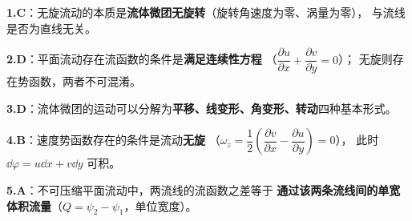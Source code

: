 \begin{tishi}
\begin{xiaowen}
\item \textbf{1.C}：无旋流动的本质是\textbf{流体微团无旋转}（旋转角速度为零、涡量为零），
与流线是否为直线无关。
\item \textbf{2.D}：平面流动存在流函数的条件是\textbf{满足连续性方程}
（$\dfrac{\partial u}{\partial x}+\dfrac{\partial v}{\partial y}=0$）；
无旋则存在势函数，两者不可混淆。
\item \textbf{3.D}：流体微团的运动可以分解为\textbf{平移、线变形、角变形、转动}四种基本形式。
\item \textbf{4.B}：速度势函数存在的条件是流动\textbf{无旋}
（$\omega_z=\dfrac{1}{2}\left(\dfrac{\partial v}{\partial x}-\dfrac{\partial u}{\partial y}\right)=0$），
此时 $\dd\varphi=u\dd x+v\dd y$ 可积。
\item \textbf{5.A}：不可压缩平面流动中，两流线的流函数之差等于
\textbf{通过该两条流线间的单宽体积流量}（$Q=\psi_2-\psi_1$，单位宽度）。
\end{xiaowen}
\end{tishi}
